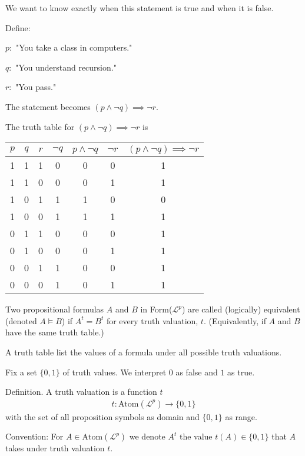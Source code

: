 \documentclass{article}
\begin{document}
We want to know exactly when this statement is true and when it is false. 

Define:

$p:$ "You take a class in computers."

$q:$ "You understand recursion."

$r:$ "You pass."

The statement becomes $(p \wedge \neg q) \implies \neg r$.

The truth table for $(p \wedge \neg q) \implies \neg r$ is


\begin{table}[h]
    \centering
    \begin{tabular}{|c|c|c|c|c|c|c|} \hline
         $p$ & $q$ & $r$ & $\neg q$ & $p \wedge \neg q$ & $\neg r$ & $(p \wedge \neg q) \implies \neg r$ \\ \hline
         1&  1&  1&  0&  0&  0& 1\\ \hline
         1&  1&  0&  0&  0&  1& 1\\ \hline
         1&  0&  1&  1&  1&  0& 0\\ \hline
         1&  0&  0&  1&  1&  1& 1\\ \hline
         0&  1&  1&  0&  0&  0& 1\\ \hline
         0&  1&  0&  0&  0&  1& 1\\ \hline
         0&  0&  1&  1&  0&  0& 1\\ \hline
         0&  0&  0&  1&  0&  1& 1\\ \hline
    \end{tabular}
\end{table}

Two propositional formulas $A$ and $B$ in Form($\mathcal{L}^p$) are called (logically) equivalent (denoted $A \vDash B$) if $A^t = B^t$ for every truth valuation, $t$. (Equivalently, if $A$ and $B$ have the same truth table.)

A truth table list the values of a formula under all possible truth valuations. 

Fix a set $\{0,1\}$ of truth values. We interpret $0$ as false and $1$ as true. 

Definition. A truth valuation is a function $t$
\begin{align*}
    t: \text{Atom}(\mathcal{L}^p) \longrightarrow \{0,1\}
\end{align*}
with the set of all proposition symbols as domain and $\{0,1\}$ as range. 

Convention: For $A \in \text{Atom}(\mathcal{L}^p)$ we denote $A^t$ the value $t(A) \in \{0,1\}$ that $A$ takes under truth valuation $t$. 
\end{document}
